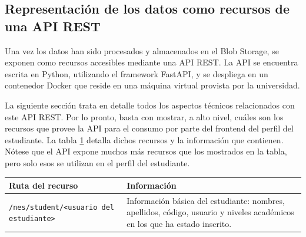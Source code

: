 \subsection{Representación de los datos como recursos de una API REST}

Una vez los datos han sido procesados y almacenados en el Blob Storage, se exponen como recursos accesibles mediante una \gls{API REST}. La \gls{API} se encuentra escrita en Python, utilizando el framework FastAPI, y se despliega en un contenedor Docker que reside en una máquina virtual provista por la universidad.

La siguiente sección trata en detalle todos los aspectos técnicos relacionados con este \gls{API REST}. Por lo pronto, basta con mostrar, a alto nivel, cuáles son los recursos que provee la \gls{API} para el consumo por parte del frontend del perfil del estudiante. La tabla \ref{tab:recursos} detalla dichos recursos y la información que contienen. Nótese que el \gls{API} expone muchos más recursos que los mostrados en la tabla, pero solo esos se utilizan en el perfil del estudiante.

\begin{table}[h]
	\centering
	\caption{Recursos de la \gls{API REST}}
	\alternatecolors
	\begin{longtable}{p{3cm}p{8cm}}
		\hline
		\textbf{Ruta del recurso}                     & \textbf{Información}                                                                                                       \\
		\hline
		\verb*|/nes/student/<usuario del estudiante>| & Información básica del estudiante: nombres, apellidos, código, usuario y niveles académicos en los que ha estado inscrito. \\
		\hline
	\end{longtable}
	\label{tab:recursos}
\end{table}